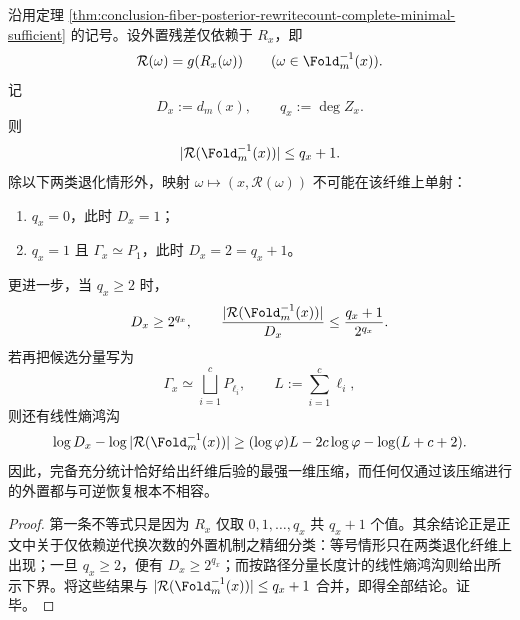 \begin{corollary}[完备充分统计与可逆外置的不相容]\label{cor:conclusion-fiber-complete-sufficient-externalization-incompatibility}
沿用定理 \ref{thm:conclusion-fiber-posterior-rewritecount-complete-minimal-sufficient} 的记号。设外置残差仅依赖于 \(R_x\)，即
\[
\mathcal R(\omega)=g(R_x(\omega))
\qquad
(\omega\in \Fold_m^{-1}(x)).
\]
记
\[
D_x:=d_m(x),
\qquad
q_x:=\deg Z_x.
\]
则
\[
|\mathcal R(\Fold_m^{-1}(x))|\le q_x+1.
\]
除以下两类退化情形外，映射 \(\omega\mapsto (x,\mathcal R(\omega))\) 不可能在该纤维上单射：
\begin{enumerate}
  \item \(q_x=0\)，此时 \(D_x=1\)；
  \item \(q_x=1\) 且 \(\Gamma_x\simeq P_1\)，此时 \(D_x=2=q_x+1\)。
\end{enumerate}
更进一步，当 \(q_x\ge 2\) 时，
\[
D_x\ge 2^{q_x},
\qquad
\frac{|\mathcal R(\Fold_m^{-1}(x))|}{D_x}\le \frac{q_x+1}{2^{q_x}}.
\]
若再把候选分量写为
\[
\Gamma_x\simeq \bigsqcup_{i=1}^{c}P_{\ell_i},
\qquad
L:=\sum_{i=1}^{c}\ell_i,
\]
则还有线性熵鸿沟
\[
\log D_x-\log |\mathcal R(\Fold_m^{-1}(x))|
\ge
(\log\varphi)L-2c\log\varphi-\log(L+c+2).
\]
因此，完备充分统计恰好给出纤维后验的最强一维压缩，而任何仅通过该压缩进行的外置都与可逆恢复根本不相容。
\end{corollary}
\begin{proof}
第一条不等式只是因为 \(R_x\) 仅取 \(0,1,\dots,q_x\) 共 \(q_x+1\) 个值。其余结论正是正文中关于仅依赖逆代换次数的外置机制之精细分类：等号情形只在两类退化纤维上出现；一旦 \(q_x\ge 2\)，便有 \(D_x\ge 2^{q_x}\)；而按路径分量长度计的线性熵鸿沟则给出所示下界。将这些结果与 \(|\mathcal R(\Fold_m^{-1}(x))|\le q_x+1\) 合并，即得全部结论。证毕。
\end{proof}

